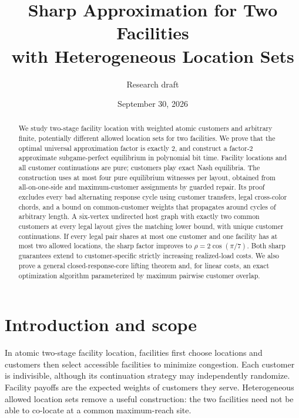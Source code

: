 \documentclass[11pt]{article}
\title{Sharp Approximation for Two Facilities\\with Heterogeneous Location Sets}
\author{Research draft}
\date{September 30, 2026}
\theoremstyle{definition}
\theoremstyle{remark}
\newcommand{\rhoG}{\rho}
\begin{document}
\maketitle
\begin{abstract}
We study two-stage facility location with weighted atomic customers and arbitrary finite, potentially different allowed location sets for two facilities. We prove that the optimal universal approximation factor is exactly $2$, and construct a factor-$2$ approximate subgame-perfect equilibrium in polynomial bit time. Facility locations and all customer continuations are pure; customers play exact Nash equilibria. The construction uses at most four pure equilibrium witnesses per layout, obtained from all-on-one-side and maximum-customer assignments by guarded repair. Its proof excludes every bad alternating response cycle using customer transfers, legal cross-color chords, and a bound on common-customer weights that propagates around cycles of arbitrary length. A six-vertex undirected host graph with exactly two common customers at every legal layout gives the matching lower bound, with unique customer continuations. If every legal pair shares at most one customer and one facility has at most two allowed locations, the sharp factor improves to $\rhoG=2\cos(\pi/7)$. Both sharp guarantees extend to customer-specific strictly increasing realized-load costs. We also prove a general closed-response-core lifting theorem and, for linear costs, an exact optimization algorithm parameterized by maximum pairwise customer overlap.
\end{abstract}

\section{Introduction and scope}

In atomic two-stage facility location, facilities first choose locations and customers then select accessible facilities to minimize congestion. Each customer is indivisible, although its continuation strategy may independently randomize. Facility payoffs are the expected weights of customers they serve. Heterogeneous allowed location sets remove a useful construction: the two facilities need not be able to co-locate at a common maximum-reach site.
\end{document}
